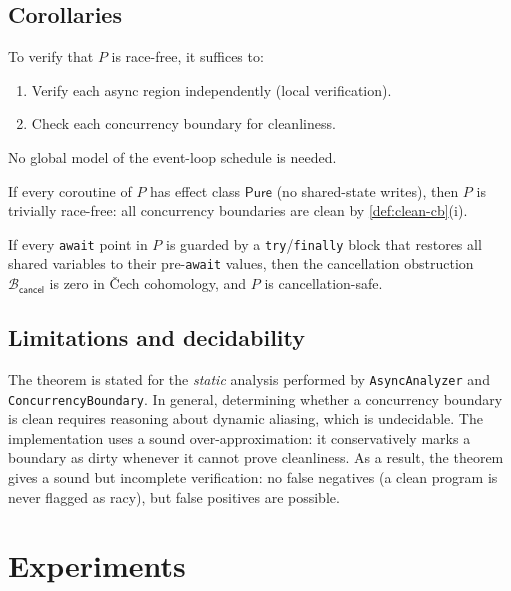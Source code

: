 \documentclass[11pt]{article}
\newcommand{\Epure}{\mathsf{Pure}}           %
\newcommand{\cancelObs}{\mathcal{B}_{\mathsf{cancel}}} %
\begin{document}
\subsection{Corollaries}

\begin{corollary}\label{cor:modular}
To verify that $P$ is race-free, it suffices to:
\begin{enumerate}
  \item Verify each async region independently (local verification).
  \item Check each concurrency boundary for cleanliness.
\end{enumerate}
No global model of the event-loop schedule is needed.
\end{corollary}

\begin{corollary}\label{cor:pure}
If every coroutine of $P$ has effect class $\Epure$ (no shared-state
writes), then $P$ is trivially race-free: all concurrency boundaries are
clean by \cref{def:clean-cb}(i).
\end{corollary}

\begin{corollary}\label{cor:cancel}
If every \texttt{await} point in $P$ is guarded by a \texttt{try}/\texttt{finally}
block that restores all shared variables to their pre-\texttt{await} values,
then the cancellation obstruction $\cancelObs$ is zero in Čech cohomology,
and $P$ is cancellation-safe.
\end{corollary}

\subsection{Limitations and decidability}

The theorem is stated for the \emph{static} analysis performed by
\texttt{AsyncAnalyzer} and \texttt{ConcurrencyBoundary}.  In general,
determining whether a concurrency boundary is clean requires reasoning about
dynamic aliasing, which is undecidable.  The implementation uses a sound
over-approximation: it conservatively marks a boundary as dirty whenever it
cannot prove cleanliness.  As a result, the theorem gives a sound but
incomplete verification: no false negatives (a clean program is never flagged
as racy), but false positives are possible.

\section{Experiments}\label{sec:experiments}
\end{document}
